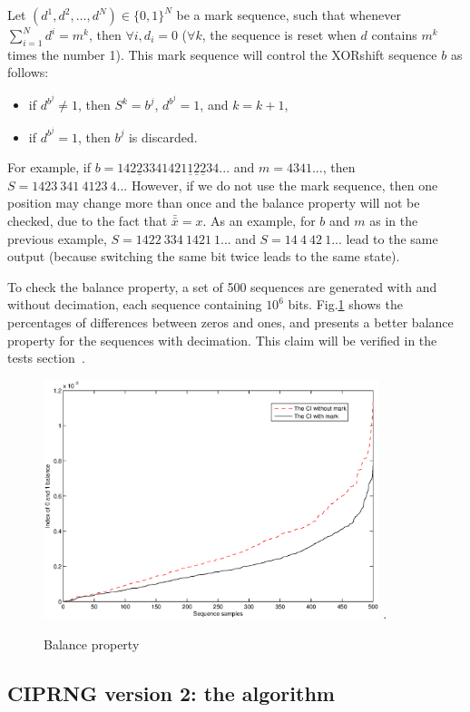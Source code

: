 Let $(d^1,d^2,\dots,d^N)\in \{0,1\}^N$ be a mark sequence, such that whenever $\sum_{i=1}^N d^i = m^k$,
then $\forall i, d_i=0$ ($\forall k$, the sequence is reset when $d$ contains $m^k$ times the number 1). This mark sequence will control the XORshift sequence $b$ as follows:
\begin{itemize}
\item if $d^{b^j} \neq 1$, then $S^k=b^j$, $d^{b^j} = 1$, and $k = k+1$,
\item if $d^{b^j}=1$, then $b^j$ is discarded.
\end{itemize}
For example, if $b = 142\underline{2}334 1421\underline{1}\underline{2}\underline{2}34...$ and $m = 4341...$, then $S=1423~341~4123~4...$ However, if we do not use the mark sequence, then one position may change more than once and the balance property will not be checked, due to the fact that $\bar{\bar{x}}=x$. As an example, for $b$ and $m$ as in the previous example, $S=1422~334~1421~1...$ and $S=14~4~42~1...$ lead to the same output (because switching the same bit twice leads to the same state).

 
To check the balance property, a set of 500
sequences are generated with and without decimation, each
sequence containing $10^6$ bits. Fig.\ref{nmark} shows the
percentages of differences between zeros and ones, and presents a better balance property for the sequences with decimation. This claim will be verified in the tests section~\cite{wbg10:ip}. 

\begin{figure}
\centering
\includegraphics[width=3.85in]{nmark.eps}
\DeclareGraphicsExtensions.
\caption{Balance property}
\label{nmark}
\end{figure}


\subsection{CIPRNG version 2: the algorithm}

